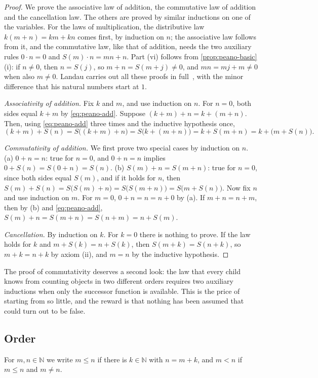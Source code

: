 \begin{proof}
We prove the associative law of addition, the commutative law of addition and the cancellation law. The others are proved by similar inductions on one of the variables. For the laws of multiplication, the distributive law $k(m+n)=km+kn$ comes first, by induction on $n$; the associative law follows from it, and the commutative law, like that of addition, needs the two auxiliary rules $0\cdot n=0$ and $S(m)\cdot n=mn+n$. Part (vi) follows from \cref{prop:peano-basic}\,(i): if $n\ne0$, then $n=S(j)$, so $m+n=S(m+j)\ne0$, and $mn=mj+m\ne0$ when also $m\ne0$. Landau carries out all these proofs in full~\cite{landau1930}, with the minor difference that his natural numbers start at $1$.

\emph{Associativity of addition.} Fix $k$ and $m$, and use induction on $n$. For $n=0$, both sides equal $k+m$ by \eqref{eq:peano-add}. Suppose $(k+m)+n=k+(m+n)$. Then, using \eqref{eq:peano-add} three times and the inductive hypothesis once,
\[
(k+m)+S(n)=S\bigl((k+m)+n\bigr)=S\bigl(k+(m+n)\bigr)=k+S(m+n)=k+\bigl(m+S(n)\bigr).
\]

\emph{Commutativity of addition.} We first prove two special cases by induction on $n$. (a) $0+n=n$: true for $n=0$, and $0+n=n$ implies $0+S(n)=S(0+n)=S(n)$. (b) $S(m)+n=S(m+n)$: true for $n=0$, since both sides equal $S(m)$, and if it holds for $n$, then $S(m)+S(n)=S\bigl(S(m)+n\bigr)=S\bigl(S(m+n)\bigr)=S\bigl(m+S(n)\bigr)$. Now fix $n$ and use induction on $m$. For $m=0$, $0+n=n=n+0$ by (a). If $m+n=n+m$, then by (b) and \eqref{eq:peano-add}, $S(m)+n=S(m+n)=S(n+m)=n+S(m)$.

\emph{Cancellation.} By induction on $k$. For $k=0$ there is nothing to prove. If the law holds for $k$ and $m+S(k)=n+S(k)$, then $S(m+k)=S(n+k)$, so $m+k=n+k$ by axiom (ii), and $m=n$ by the inductive hypothesis.
\end{proof}

The proof of commutativity deserves a second look: the law that every child knows from counting objects in two different orders requires two auxiliary inductions when only the successor function is available. This is the price of starting from so little, and the reward is that nothing has been assumed that could turn out to be false.

\subsection{Order}

\begin{definition}
\label{def:n-order}
For $m,n\in\mathbb N$ we write $m\le n$ if there is $k\in\mathbb N$ with $n=m+k$, and $m<n$ if $m\le n$ and $m\ne n$.
\end{definition}

